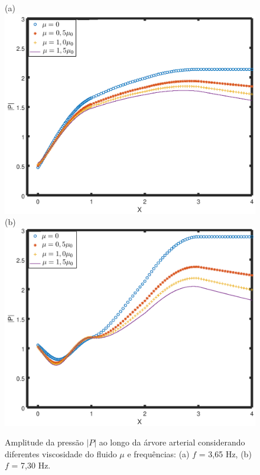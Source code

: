 \documentclass[
        english,			
        brazil			        %
        ,<...>]{abntbibufjf}
\begin{document}
\begin{figure}[!htbp]
	\centering
	(a) \\
	\includegraphics[scale=0.7]{figure3-result/Figure3-f-3-65-new.png}\\
	(b)\\
	\includegraphics[scale=0.7]{figure3-result/Figure3_f_7_30_new.png}\\
	\caption{Amplitude da pressão $|P|$ ao longo da árvore arterial considerando diferentes viscosidade do fluido $\mu$ e frequências: (a) $f$ = 3,65 Hz, (b)  $f$ = 7,30 Hz. }
	\label{fig3a:arterial-tree}%
\end{figure}
\end{document}
